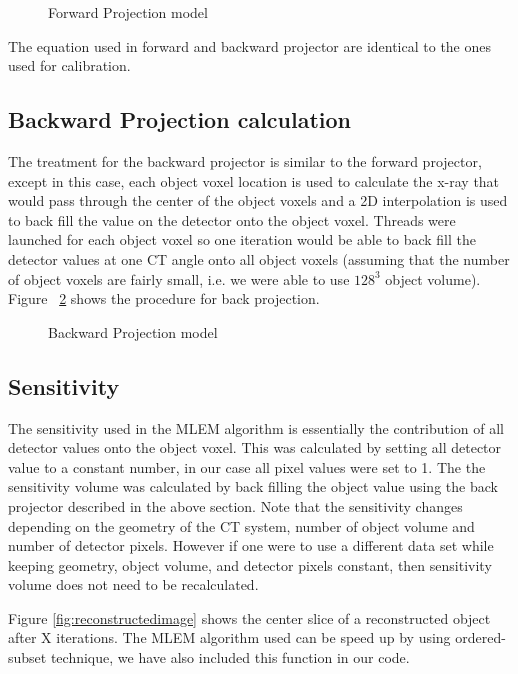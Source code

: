 \begin{figure}
\centering
	\label{fig:forwardprojection}
	\caption{Forward Projection model}
\end{figure}

The equation used in forward and backward projector are identical to the ones used for calibration.

\subsection{Backward Projection calculation}
The treatment for the backward projector is similar to the forward projector, except in this case, each object voxel location is used to calculate the x-ray that would pass through the center of the object voxels and a 2D interpolation is used to back fill the value on the detector onto the object voxel.  Threads were launched for each object voxel so one iteration would be able to back fill the detector values at one CT angle onto all object voxels (assuming that the number of object voxels are fairly small, i.e. we were able to use $128^3$ object volume).  Figure ~\ref{fig:backwardprojectior} shows the procedure for back projection.
\begin{figure}
\centering
{}
\label{fig:backwardprojectior}
\caption{Backward Projection model}
\end{figure}


\subsection{Sensitivity}
The sensitivity used in the MLEM algorithm is essentially the contribution of all detector values onto the object voxel.  This was calculated by setting all detector value to a constant number, in our case all pixel values were set to 1.  The the sensitivity volume was calculated by back filling the object value using the back projector described in the above section.  Note that the sensitivity changes depending on the geometry of the CT system, number of object volume and number of detector pixels.  However if one were to use a different data set while keeping geometry, object volume, and detector pixels constant, then sensitivity volume does not need to be recalculated.

Figure \ref{fig:reconstructedimage} shows the center slice of a reconstructed object after X iterations.  The MLEM algorithm used can be speed up by using ordered-subset technique, we have also included this function in our code.  

